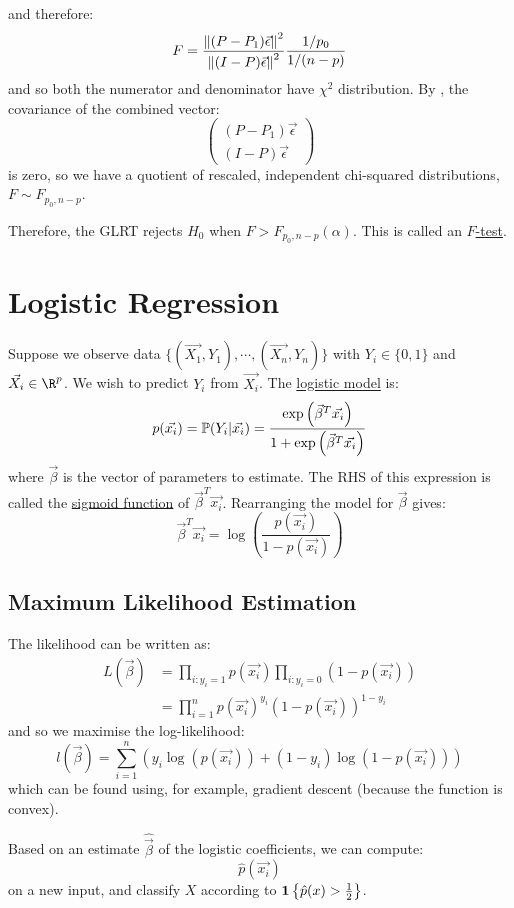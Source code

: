 \documentclass[../Main.tex]{subfiles}
\begin{document}
and therefore:
\begin{equation*}
    F = \frac{\norm{(P - P_1)\vec{\epsilon}}^2}{\norm{(I - P)\vec{\epsilon}}^2} \frac{1 / p_0}{1 / (n - p)}
\end{equation*}
and so both the numerator and denominator have $\chi^2$ distribution. By , the covariance of the combined vector:
\begin{equation*}
    \begin{pmatrix}(P - P_1)\vec{\epsilon} \\ (I - P)\vec{\epsilon}\end{pmatrix}
\end{equation*}
is zero, so we have a quotient of rescaled, independent chi-squared distributions, $F \sim F_{p_0, n-p}$.

Therefore, the GLRT rejects $H_0$ when $F > F_{p_0, n-p}(\alpha)$. This is called an \underline{$F$-test}.
\section{Logistic Regression}
Suppose we observe data $\{(\vec{X_1}, Y_1), \cdots, (\vec{X_n}, Y_n)\}$ with $Y_i \in \{0, 1\}$ and $\vec{X_i} \in \R^p$. We wish to predict $Y_i$ from $\vec{X_i}$. The \underline{logistic model} is:
\begin{equation*}
    p(\vec{x_i}) = \P(Y_i | \vec{x_i}) = \frac{\exp\left(\vec{\beta}^T \vec{x_i}\right)}{1 + \exp\left(\vec{\beta}^T \vec{x_i}\right)}
\end{equation*}
where $\vec{\beta}$ is the vector of parameters to estimate. The RHS of this expression is called the \underline{sigmoid function} of $\vec{\beta}^T \vec{x_i}$. Rearranging the model for $\vec{\beta}$ gives:
\begin{equation*}
    \vec{\beta}^T \vec{x_i} = \log\left(\frac{p(\vec{x_i})}{1 - p(\vec{x_i})}\right)
\end{equation*}
\subsection{Maximum Likelihood Estimation}
The likelihood can be written as:
\begin{align*}
    L(\vec{\beta}) &= \prod_{i : y_i = 1} p(\vec{x_i}) \prod_{i : y_i = 0} (1 - p(\vec{x_i})) \\
    &= \prod_{i=1}^{n} p(\vec{x_i})^{y_i}(1 - p(\vec{x_i}))^{1 - y_i}
\end{align*}
and so we maximise the log-likelihood:
\begin{equation*}
    l(\vec{\beta}) = \sum_{i=1}^{n} \left(y_i \log(p(\vec{x_i})) + (1 - y_i) \log(1 - p(\vec{x_i}))\right)
\end{equation*}
which can be found using, for example, gradient descent (because the function is convex).

Based on an estimate $\hat{\vec{\beta}}$ of the logistic coefficients, we can compute:
\begin{equation*}
    \hat{p}(\vec{x_i})
\end{equation*}
on a new input, and classify $X$ according to $\ind{\hat{p}(x) > \frac12}$.
\end{document}
